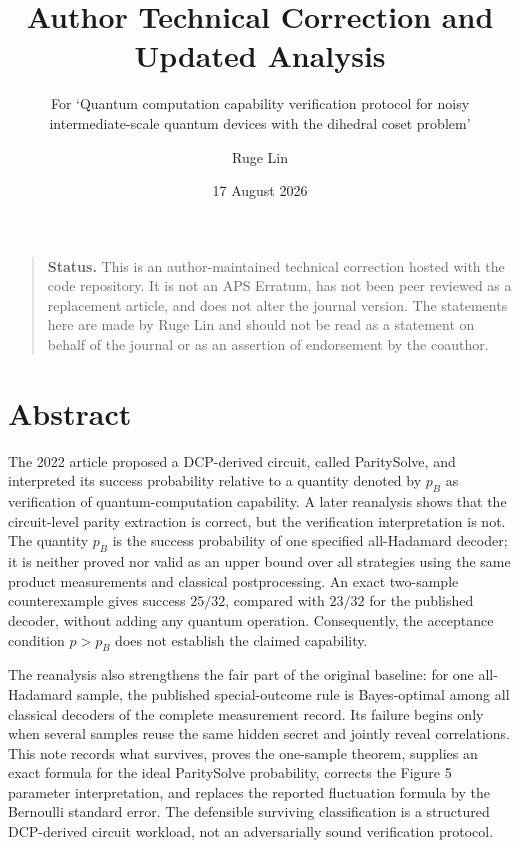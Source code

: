 \documentclass[
  10pt,
]{article}
\title{Author Technical Correction and Updated Analysis}
\subtitle{For `Quantum computation capability verification protocol for noisy
intermediate-scale quantum devices with the dihedral coset problem'}
\author{Ruge Lin}
\date{17 August 2026}
\begin{document}
\maketitle

{
\setcounter{tocdepth}{2}
\tableofcontents
}
\begin{quote}
\textbf{Status.} This is an author-maintained technical correction
hosted with the code repository. It is not an APS Erratum, has not been
peer reviewed as a replacement article, and does not alter the journal
version. The statements here are made by Ruge Lin and should not be read
as a statement on behalf of the journal or as an assertion of
endorsement by the coauthor.
\end{quote}

\section{Abstract}\label{abstract}

The 2022 article proposed a DCP-derived circuit, called ParitySolve, and
interpreted its success probability relative to a quantity denoted by
\(p_B\) as verification of quantum-computation capability. A later
reanalysis shows that the circuit-level parity extraction is correct,
but the verification interpretation is not. The quantity \(p_B\) is the
success probability of one specified all-Hadamard decoder; it is neither
proved nor valid as an upper bound over all strategies using the same
product measurements and classical postprocessing. An exact two-sample
counterexample gives success \(25/32\), compared with \(23/32\) for the
published decoder, without adding any quantum operation. Consequently,
the acceptance condition \(p>p_B\) does not establish the claimed
capability.

The reanalysis also strengthens the fair part of the original baseline:
for one all-Hadamard sample, the published special-outcome rule is
Bayes-optimal among all classical decoders of the complete measurement
record. Its failure begins only when several samples reuse the same
hidden secret and jointly reveal correlations. This note records what
survives, proves the one-sample theorem, supplies an exact formula for
the ideal ParitySolve probability, corrects the Figure 5 parameter
interpretation, and replaces the reported fluctuation formula by the
Bernoulli standard error. The defensible surviving classification is a
structured DCP-derived circuit workload, not an adversarially sound
verification protocol.
\end{document}
